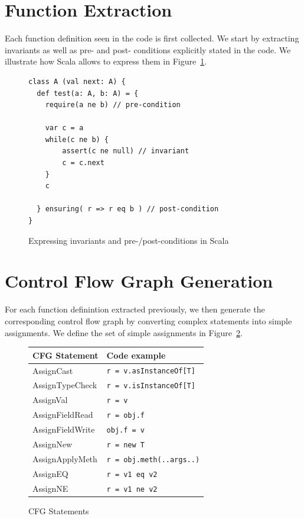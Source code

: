 \section{Function Extraction}
Each function definition seen in the code is first collected. We start by
extracting invariants as well as pre- and post- conditions explicitly stated in
the code. We illustrate how Scala allows to express them in
Figure~\ref{fig:fe:example1}.

\begin{figure}[h]
    \centering
\begin{lstlisting}
class A (val next: A) {
  def test(a: A, b: A) = {
    require(a ne b) // pre-condition

    var c = a
    while(c ne b) {
        assert(c ne null) // invariant
        c = c.next
    }
    c

  } ensuring( r => r eq b ) // post-condition
}
\end{lstlisting}
    \caption{Expressing invariants and pre-/post-conditions in Scala}
    \label{fig:fe:example1}
\end{figure}

\section{Control Flow Graph Generation}
For each function definintion extracted previously, we then generate the
corresponding control flow graph by converting complex statements into simple
assignments. We define the set of simple assignments in
Figure~\ref{fig:cfg:statements}.

\FloatBarrier
\begin{figure}[h]
    \centering

    \begin{tabular}{ l | l }
        CFG Statement               & Code example \\
        \hline
        AssignCast       & \verb/r = v.asInstanceOf[T]/  \\
        AssignTypeCheck  & \verb/r = v.isInstanceOf[T]/  \\
        AssignVal        & \verb/r = v/  \\
        AssignFieldRead  & \verb/r = obj.f/  \\
        AssignFieldWrite & \verb/obj.f = v/  \\
        AssignNew        & \verb/r = new T/  \\
        AssignApplyMeth  & \verb/r = obj.meth(..args..)/  \\
        AssignEQ         & \verb/r = v1 eq v2/  \\
        AssignNE         & \verb/r = v1 ne v2/  \\
    \end{tabular}

    \caption{CFG Statements}
    \label{fig:cfg:statements}
\end{figure}

